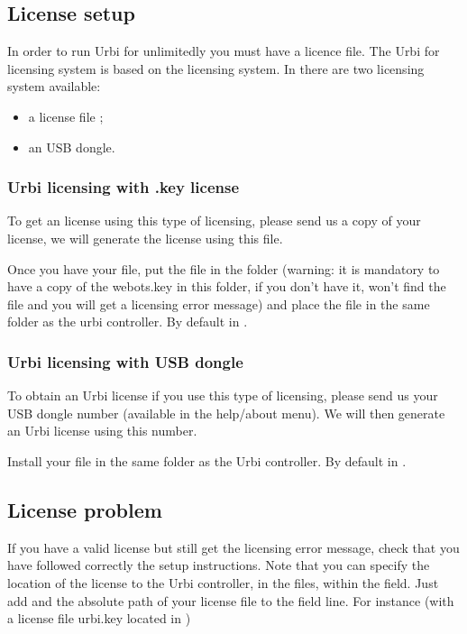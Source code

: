 \subsection{License setup}

In order to run Urbi for \webots unlimitedly you must have a licence
file.  The Urbi for \webots licensing system is based on the \webots
licensing system.  In \webots there are two licensing system available:
\begin{itemize}
\item a license file ;
\item an USB dongle.
\end{itemize}

\subsubsection{Urbi licensing with \webots.key license}

To get an \urbi license using this type of licensing, please send us a
copy of your  license, we will generate the \urbi
license using this file.

Once you have your  file, put the 
file in the folder  (warning: it is mandatory
to have a copy of the webots.key in this folder, if you don't have it,
\urbi won't find the  file and you will get a
licensing error message) and place the  file in the
same folder as the urbi controller. By default in
.


\subsubsection{Urbi licensing with USB dongle}

To obtain an Urbi license if you use this type of licensing, please
send us your \webots USB dongle number (available in the help/about
\webots menu). We will then generate an Urbi license using this number.

Install your  file in the same folder as the Urbi
controller.  By default in
.

\subsection{License problem}

If you have a valid license but still get the licensing error message,
check that you have followed correctly the setup instructions. Note
that you can specify the location of the  license to
the Urbi controller, in the  files, within the
 field. Just add  and the absolute
path of your license file to the field line. For instance (with a
license file urbi.key located in )

